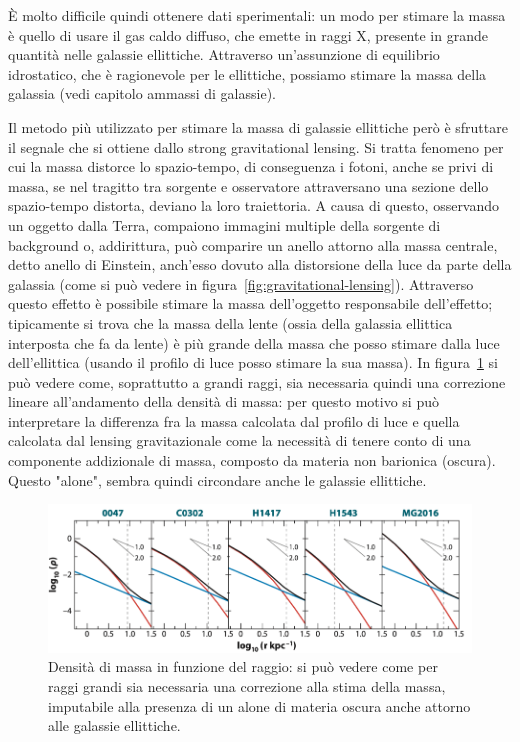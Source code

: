 È molto difficile quindi ottenere dati sperimentali: un modo per stimare la massa è quello di usare il gas caldo diffuso, che emette in raggi X, presente in grande quantità nelle galassie ellittiche. Attraverso un’assunzione di equilibrio idrostatico, che è ragionevole per le ellittiche, possiamo stimare la massa della galassia (vedi capitolo ammassi di galassie).

Il metodo più utilizzato per stimare la massa di galassie ellittiche però è sfruttare il segnale che si ottiene dallo strong gravitational lensing. Si tratta fenomeno per cui la massa distorce lo spazio-tempo, di conseguenza i fotoni, anche se privi di massa, se nel tragitto tra sorgente e osservatore attraversano una sezione dello spazio-tempo distorta, deviano la loro traiettoria. A causa di questo, osservando un oggetto dalla Terra, compaiono immagini multiple della sorgente di background o, addirittura, può comparire un anello attorno alla massa centrale, detto anello di Einstein, anch'esso dovuto alla distorsione della luce da parte della galassia (come si può vedere in figura~\ref{fig:gravitational-lensing}). Attraverso questo effetto è possibile stimare la massa dell’oggetto responsabile dell’effetto; tipicamente si trova che la massa della lente (ossia della galassia ellittica interposta che fa da lente) è più grande della massa che posso stimare dalla luce dell’ellittica (usando il profilo di luce posso stimare la sua massa). In figura~\ref{fig:materia-oscura-ellittiche} si può vedere come, soprattutto a grandi raggi, sia necessaria quindi una correzione lineare all'andamento della densità di massa: per questo motivo si può interpretare la differenza fra la massa calcolata dal profilo di luce e quella calcolata dal lensing gravitazionale come la necessità di tenere conto di una componente addizionale di massa, composto da materia non barionica (oscura). Questo "alone", sembra quindi circondare anche le galassie ellittiche.

\begin{figure}
    \centering
    \includegraphics[width = 0.8 \textwidth]{immagini/materia-oscura-ellittiche.png}
    \caption{Densità di massa in funzione del raggio: si può vedere come per raggi grandi sia necessaria una correzione alla stima della massa, imputabile alla presenza di un alone di materia oscura anche attorno alle galassie ellittiche.}
    \label{fig:materia-oscura-ellittiche}
\end{figure}